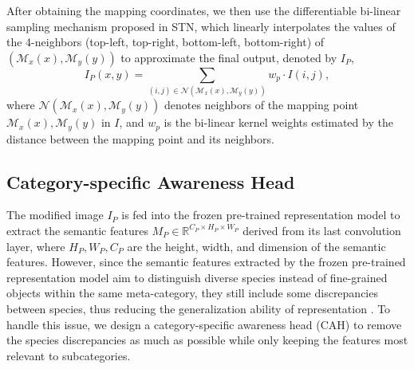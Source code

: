 \documentclass[letterpaper]{article} %
\begin{document}
After obtaining the mapping coordinates, we then use the differentiable bi-linear sampling mechanism proposed in STN, which linearly interpolates the values of the 4-neighbors (top-left, top-right, bottom-left, bottom-right) of $ (\mathcal{M}_x(x), \mathcal{M}_y(y)) $ to approximate the final output, denoted by $ I_P $,
\begin{equation}
I_P(x,y) = \sum_{(i,j)\in\mathcal{N}(\mathcal{M}_x(x), \mathcal{M}_y(y))} w_p \cdot I(i,j),
\end{equation}
where $ \mathcal{N}(\mathcal{M}_x(x), \mathcal{M}_y(y)) $ denotes neighbors of the mapping point $ \mathcal{M}_x(x), \mathcal{M}_y(y) $ in $ I $, and $ w_p $ is the bi-linear kernel weights estimated by the distance between the mapping point and its neighbors.

\subsection{Category-specific Awareness Head}
The modified image $ I_P $ is fed into the frozen pre-trained representation model to extract the semantic features $ M_P \in \mathbb{R}^{C_P\times H_P \times W_P} $ derived from its last convolution layer, where $ H_P, W_P, C_P $ are the height, width, and dimension of the semantic features.
However, since the semantic features extracted by the frozen pre-trained representation model aim to distinguish diverse species instead of fine-grained objects within the same meta-category, they still include some discrepancies between species, thus reducing the generalization ability of representation \cite{DBLP:conf/cvpr/WangWYLLL20,  DBLP:conf/mm/WangWZLZL19, DBLP:conf/aaai/WangWLDL20}.
To handle this issue, we design a category-specific awareness head (CAH) to remove the species discrepancies as much as possible while only keeping the features most relevant to subcategories.
\end{document}

